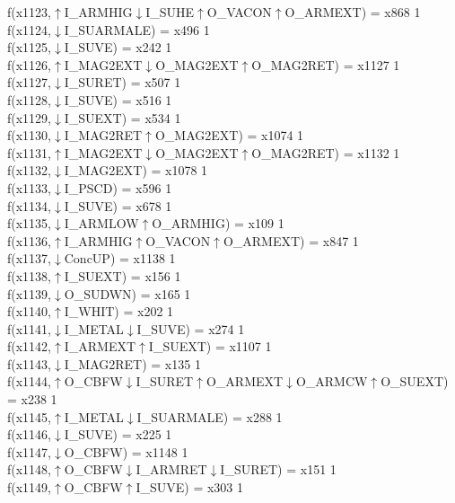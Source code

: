 f(x1123,$\uparrow$I\_ARMHIG$\downarrow$I\_SUHE$\uparrow$O\_VACON$\uparrow$O\_ARMEXT) = x868 {1} \\
f(x1124,$\downarrow$I\_SUARMALE) = x496 {1} \\
f(x1125,$\downarrow$I\_SUVE) = x242 {1} \\
f(x1126,$\uparrow$I\_MAG2EXT$\downarrow$O\_MAG2EXT$\uparrow$O\_MAG2RET) = x1127 {1} \\
f(x1127,$\downarrow$I\_SURET) = x507 {1} \\
f(x1128,$\downarrow$I\_SUVE) = x516 {1} \\
f(x1129,$\downarrow$I\_SUEXT) = x534 {1} \\
f(x1130,$\downarrow$I\_MAG2RET$\uparrow$O\_MAG2EXT) = x1074 {1} \\
f(x1131,$\uparrow$I\_MAG2EXT$\downarrow$O\_MAG2EXT$\uparrow$O\_MAG2RET) = x1132 {1} \\
f(x1132,$\downarrow$I\_MAG2EXT) = x1078 {1} \\
f(x1133,$\downarrow$I\_PSCD) = x596 {1} \\
f(x1134,$\downarrow$I\_SUVE) = x678 {1} \\
f(x1135,$\downarrow$I\_ARMLOW$\uparrow$O\_ARMHIG) = x109 {1} \\
f(x1136,$\uparrow$I\_ARMHIG$\uparrow$O\_VACON$\uparrow$O\_ARMEXT) = x847 {1} \\
f(x1137,$\downarrow$ConcUP) = x1138 {1} \\
f(x1138,$\uparrow$I\_SUEXT) = x156 {1} \\
f(x1139,$\downarrow$O\_SUDWN) = x165 {1} \\
f(x1140,$\uparrow$I\_WHIT) = x202 {1} \\
f(x1141,$\downarrow$I\_METAL$\downarrow$I\_SUVE) = x274 {1} \\
f(x1142,$\uparrow$I\_ARMEXT$\uparrow$I\_SUEXT) = x1107 {1} \\
f(x1143,$\downarrow$I\_MAG2RET) = x135 {1} \\
f(x1144,$\uparrow$O\_CBFW$\downarrow$I\_SURET$\uparrow$O\_ARMEXT$\downarrow$O\_ARMCW$\uparrow$O\_SUEXT) = x238 {1} \\
f(x1145,$\uparrow$I\_METAL$\downarrow$I\_SUARMALE) = x288 {1} \\
f(x1146,$\downarrow$I\_SUVE) = x225 {1} \\
f(x1147,$\downarrow$O\_CBFW) = x1148 {1} \\
f(x1148,$\uparrow$O\_CBFW$\downarrow$I\_ARMRET$\downarrow$I\_SURET) = x151 {1} \\
f(x1149,$\uparrow$O\_CBFW$\uparrow$I\_SUVE) = x303 {1} \\
